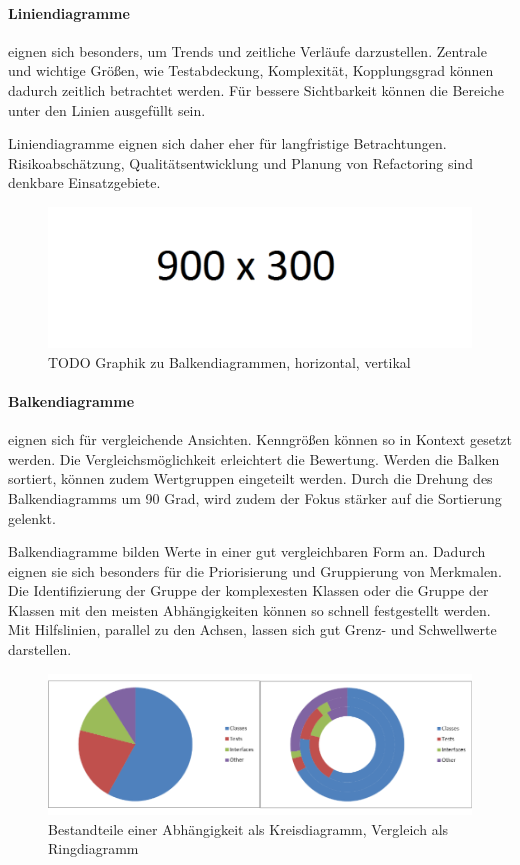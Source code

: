 \paragraph{Liniendiagramme} eignen sich besonders, um Trends und zeitliche Verläufe darzustellen. Zentrale und wichtige Größen, wie Testabdeckung, Komplexität, Kopplungsgrad können dadurch zeitlich betrachtet werden. Für bessere Sichtbarkeit können die Bereiche unter den Linien ausgefüllt sein.

Liniendiagramme eignen sich daher eher für langfristige Betrachtungen. Risikoabschätzung, Qualitätsentwicklung und Planung von Refactoring sind denkbare Einsatzgebiete.

\begin{figure}[htbp]
  \includegraphics[width=\textwidth, height=\textheight, keepaspectratio]
    {resources/900x300.pdf}
  \caption{TODO Graphik zu Balkendiagrammen, horizontal, vertikal}
  \label{bar-chart}
\end{figure}
\paragraph{Balkendiagramme} eignen sich für vergleichende Ansichten. Kenngrößen können so in Kontext gesetzt werden. Die Vergleichsmöglichkeit erleichtert die Bewertung. Werden die Balken sortiert, können zudem Wertgruppen eingeteilt werden. Durch die Drehung des Balkendiagramms um 90 Grad, wird zudem der Fokus stärker auf die Sortierung gelenkt.

Balkendiagramme bilden Werte in einer gut vergleichbaren Form an. Dadurch eignen sie sich besonders für die Priorisierung und Gruppierung von Merkmalen.
Die Identifizierung der Gruppe der komplexesten Klassen oder die Gruppe der Klassen mit den meisten Abhängigkeiten können so schnell festgestellt werden. Mit Hilfslinien, parallel zu den Achsen, lassen sich gut Grenz- und Schwellwerte darstellen.

\begin{figure}[htbp]
  \includegraphics[width=\textwidth, height=\textheight, keepaspectratio]
    {resources/circle-graph.pdf}
  \caption{Bestandteile einer Abhängigkeit als Kreisdiagramm, Vergleich als Ringdiagramm}
  \label{circle-chart}
\end{figure}
